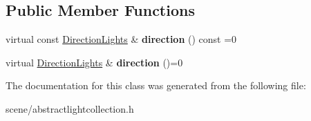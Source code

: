 \subsection*{Public Member Functions}
\begin{DoxyCompactItemize}
\item 
\hypertarget{class_tempest_1_1_abstract_light_collection_a92168e9e668f1ab4b8c5b41a2fb28a95}{virtual const \hyperlink{class_tempest_1_1_abstract_light_collection_1_1_pack}{Direction\+Lights} \& {\bfseries direction} () const =0}\label{class_tempest_1_1_abstract_light_collection_a92168e9e668f1ab4b8c5b41a2fb28a95}

\item 
\hypertarget{class_tempest_1_1_abstract_light_collection_ae327ede02c4371f165db9a61117ee260}{virtual \hyperlink{class_tempest_1_1_abstract_light_collection_1_1_pack}{Direction\+Lights} \& {\bfseries direction} ()=0}\label{class_tempest_1_1_abstract_light_collection_ae327ede02c4371f165db9a61117ee260}

\end{DoxyCompactItemize}


The documentation for this class was generated from the following file\+:\begin{DoxyCompactItemize}
\item 
scene/abstractlightcollection.\+h\end{DoxyCompactItemize}
